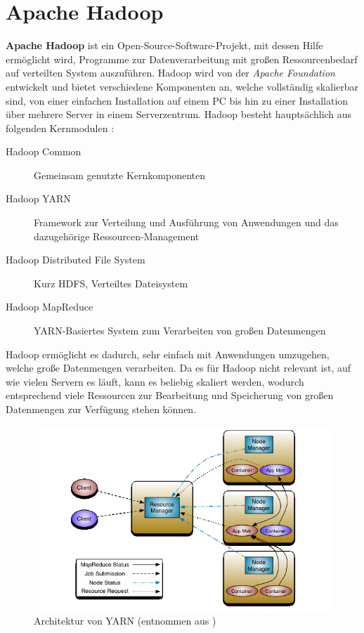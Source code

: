 \section{Apache Hadoop}\label{sec:hadoop}

\textbf{Apache Hadoop} ist ein Open-Source-Software-Projekt, mit dessen Hilfe ermöglicht wird, Programme zur Datenverarbeitung mit großen Ressourcenbedarf auf verteilten System auszuführen. Hadoop wird von der \emph{Apache Foundation} entwickelt und bietet verschiedene Komponenten an, welche vollständig skalierbar sind, von einer einfachen Installation auf einem PC bis hin zu einer Installation über mehrere Server in einem Serverzentrum. Hadoop besteht hauptsächlich aus folgenden Kernmodulen \cite{HadoopHomePage}:

\begin{description}
	\item[Hadoop Common] Gemeinsam genutzte Kernkomponenten
	\item[Hadoop YARN] Framework zur Verteilung und Ausführung von Anwendungen und das dazugehörige Ressourcen-Management
	\item[Hadoop Distributed File System] Kurz HDFS, Verteiltes Dateisystem
	\item[Hadoop MapReduce] YARN-Basiertes System zum Verarbeiten von großen Datenmengen
\end{description}

Hadoop ermöglicht es dadurch, sehr einfach mit Anwendungen umzugehen, welche große Datenmengen verarbeiten. Da es für Hadoop nicht relevant ist, auf wie vielen Servern es läuft, kann es beliebig skaliert werden, wodurch entsprechend viele Ressourcen zur Bearbeitung und Speicherung von großen Datenmengen zur Verfügung stehen können.

\begin{figure}
	\centering
	\includegraphics[width=\columnwidth]{./images/yarn_architecture.png}
	\caption[Architektur von YARN]{Architektur von YARN (entnommen aus \cite{HadoopYarnArch271})}
	\label{fig:yarnarch}
\end{figure}

